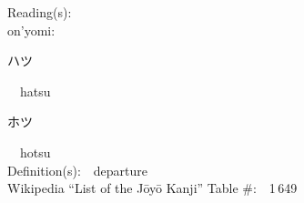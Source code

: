 \begin{multicols}{2}
Reading(s):\ \ \\
{\hspace*{1em}}on'yomi:\ \ \\
{\hspace*{2em}}{\begin{CJK}{UTF8}{min} ハツ \end{CJK}}\ \ hatsu\ \ \\
{\hspace*{2em}}{\begin{CJK}{UTF8}{min} ホツ \end{CJK}}\ \ hotsu\ \ \\
Definition(s):\ \ departure \\
Wikipedia ``List of the J\=oy\=o Kanji'' Table \#:\ \ 1\,649 \\
\ \ \\
\end{multicols}



